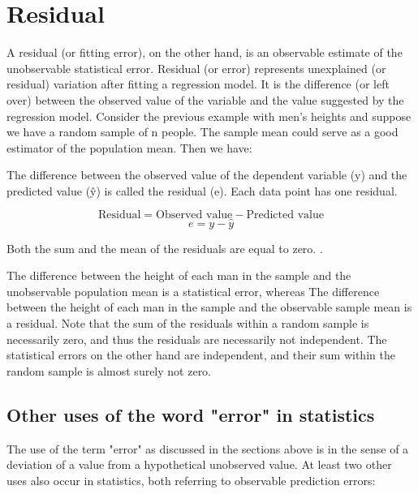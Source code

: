 \documentclass[a4paper,12pt]{article}
\begin{document}
	
	\tableofcontents
	\newpage
	

\section{Residual}

A residual (or fitting error), on the other hand, is an observable estimate of the unobservable statistical error.
Residual (or error) represents unexplained (or residual) variation after fitting a regression model. It is the difference (or left over) between the observed value of the variable and the value suggested by the regression model.
Consider the previous example with men's heights and suppose we have a random sample of n people. The sample mean could serve as a good estimator of the population mean. Then we have:


The difference between the observed value of the dependent variable (y) and the predicted value (ŷ) is called the residual (e). Each data point has one residual.

\[ \mbox{Residual} = \mbox{Observed value} - \mbox{Predicted value}\]
\[e = y - \hat{y} \]

Both the sum and the mean of the residuals are equal to zero. .



The difference between the height of each man in the sample and the unobservable population mean is a statistical error, whereas
The difference between the height of each man in the sample and the observable sample mean is a residual.
Note that the sum of the residuals within a random sample is necessarily zero, and thus the residuals are necessarily not independent. The statistical errors on the other hand are independent, and their sum within the random sample is almost surely not zero.


\subsection{Other uses of the word "error" in statistics}

The use of the term "error" as discussed in the sections above is in the sense of a deviation of a value from a hypothetical unobserved value. At least two other uses also occur in statistics, both referring to observable prediction errors:
\end{document}
